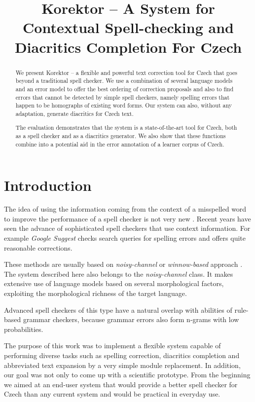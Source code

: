 \documentclass[11pt]{article}
\title{Korektor -- A System for Contextual Spell-checking and Diacritics Completion For Czech}
\date{}
\begin{document}
\maketitle

\begin{abstract}
  We present Korektor -- a flexible and powerful text correction tool
  for Czech that goes beyond a traditional spell checker. We use a combination of several language
  models and an error model to offer the best ordering of
  correction proposals and also to find errors that cannot be detected
  by simple spell checkers, namely spelling errors that happen to be
  homographs of existing word forms. Our system can also,
  without any adaptation, generate diacritics for Czech text.

  The evaluation demonstrates that the system is a state-of-the-art
  tool for Czech, both as a spell checker and as a diacritics
  generator. We also show that these functions combine into a
  potential aid in the error annotation of a learner corpus of
  Czech.
\end{abstract}

\section{Introduction}
The idea of using the information coming from the context of a
misspelled word to improve the performance of a spell checker is not
very new \cite{Mays1991}. Recent years have seen the advance of
sophisticated spell checkers that use context information.  For
example \emph{Google Suggest} checks search queries for spelling
errors and offers quite reasonable corrections.

These methods are usually based on \emph{noisy-channel} or
\emph{winnow-based} approach \cite{Winnow}. The system described here
also belongs to the \emph{noisy-channel} class. It makes extensive use
of language models based on several morphological factors, exploiting
the morphological richness of the target language.


Advanced spell checkers of this type have a natural overlap with abilities 
of rule-based grammar checkers, because grammar errors also form n-grams 
with low probabilities. 

The purpose of this work was to
implement a flexible system capable of performing diverse tasks such as
spelling correction, diacritics completion and abbreviated text expansion by a
very simple module replacement. In addition, our goal was not only to come up with a
scientific prototype. From the beginning we aimed at an end-user system that
would provide a better spell checker for Czech than any current system and would be 
practical in everyday use.
\end{document}
